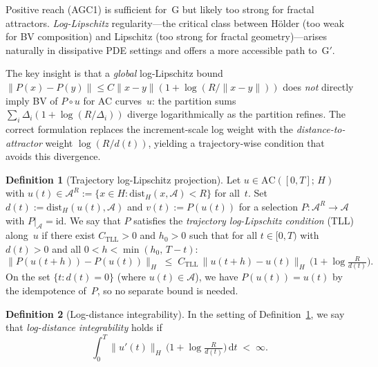 \documentclass[12pt,a4paper]{article}
\theoremstyle{definition}
\newtheorem{definition}{Definition}[section]
\theoremstyle{plain}
\theoremstyle{remark}
\begin{document}
Positive reach (AGC1) is sufficient for~G but likely too strong for
fractal attractors.  \emph{Log-Lipschitz} regularity---the critical
class between H\"older (too weak for BV composition) and Lipschitz
(too strong for fractal geometry)---arises naturally in dissipative
PDE settings and offers a more accessible path to~G$'$.

The key insight is that a \emph{global} log-Lipschitz bound
$\|P(x)-P(y)\| \le C\|x-y\|(1+\log(R/\|x-y\|))$ does
\emph{not} directly imply BV of $P\circ u$ for AC curves~$u$:
the partition sums $\sum_i \Delta_i(1+\log(R/\Delta_i))$ diverge
logarithmically as the partition refines.  The correct formulation
replaces the increment-scale log weight with the
\emph{distance-to-attractor} weight $\log(R/d(t))$, yielding a
trajectory-wise condition that avoids this divergence.

\begin{definition}[Trajectory log-Lipschitz projection]
\label{def:TLL}
Let $u \in \mathrm{AC}([0,T];\,H)$ with $u(t) \in \mathcal{A}^R
:= \{x \in H : \mathrm{dist}_H(x,\mathcal{A}) < R\}$ for all~$t$.
Set $d(t) := \mathrm{dist}_H(u(t),\mathcal{A})$ and
$v(t) := P(u(t))$ for a selection
$P: \mathcal{A}^R \to \mathcal{A}$ with $P|_{\mathcal{A}} = \mathrm{id}$.
We say that $P$ satisfies the \emph{trajectory log-Lipschitz
condition} (TLL) along~$u$ if there exist $C_{\mathrm{TLL}} > 0$ and
$h_0 > 0$ such that for all $t \in [0,T)$ with $d(t) > 0$ and
all $0 < h < \min(h_0,\, T-t)$:
\begingroup
\renewcommand{\theequation}{TLL}
\renewcommand{\theHequation}{TLL}
\begin{equation}\label{eq:TLL}
  \|P(u(t\!+\!h)) - P(u(t))\|_H
  \;\le\;
  C_{\mathrm{TLL}}\,\|u(t\!+\!h) - u(t)\|_H\,
  \bigl(1 + \log\tfrac{R}{d(t)}\bigr).
\end{equation}
\endgroup
On the set $\{t : d(t)=0\}$ (where $u(t) \in \mathcal{A}$), we have
$P(u(t)) = u(t)$ by the idempotence of~$P$, so no separate bound
is needed.
\end{definition}

\begin{definition}[Log-distance integrability]
\label{def:LDI}
In the setting of Definition~\ref{def:TLL}, we say that
\emph{log-distance integrability} holds if
\begingroup
\renewcommand{\theequation}{LDI}
\renewcommand{\theHequation}{LDI}
\begin{equation}\label{eq:LDI}
  \int_0^T \|u'(t)\|_H\,
  \bigl(1 + \log\tfrac{R}{d(t)}\bigr)\,\mathrm{d}t
  \;<\; \infty.
\end{equation}
\endgroup
\end{definition}
\end{document}
